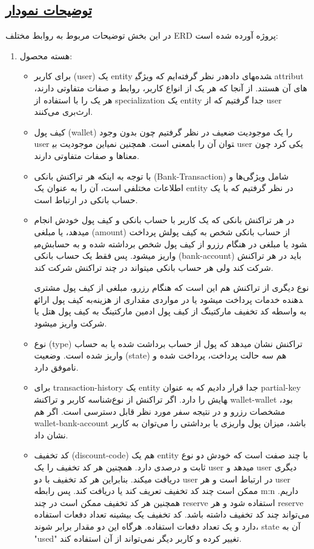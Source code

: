 \documentclass[12pt]{exam}
\begin{document}
\subsection*{\underline{توضیحات نمودار}}

در این بخش توضیحات مربوط به روابط مختلف ERD پروژه آورده شده است:

\begin{enumerate}
	\item هسته محصول:
	\begin{itemize}
		\item 
برای کاربر (user) یک entity در نظر گرفته‌ایم که ویژگی‎های داده‎شده attribut های آن هستند. از آنجا که هر یک از انواع کاربر، روابط و صفات متفاوتی دارند، هر یک را با استفاده از specialization یک entity جدا گرفتیم که از user ارث‌بری می‌کنند.
		\item 
کیف پول (wallet) را یک موجودیت ضعیف در نظر گرفتیم چون بدون وجود user این موجودیت بی‎معنی است. همچنین نمی‎توان آن را با user یکی کرد چون معناها و صفات متفاوتی دارند.
		\item 
با توجه به اینکه هر تراکنش بانکی (Bank-Transaction) شامل ویژگی‌ها و اطلاعات مختلفی است، آن را به عنوان یک entity در نظر گرفتیم که با یک حساب بانکی در ارتباط است.

		\item 
		در هر تراکنش بانکی که یک کاربر با حساب بانکی و کیف پول خودش انجام میدهد، یا مبلغی (amount) از حساب بانکی شخص به کیف پولش پرداخت می‎شود یا مبلغی در هنگام رزرو از کیف پول شخص برداشته شده و به حسابش واریز میشود.
		پس فقط یک حساب بانکی (bank-account) باید در هر تراکنش شرکت کند ولی هر حساب بانکی میتواند در چند تراکنش شرکت کند.
		
		نوع دیگری از تراکنش هم این است که هنگام رزرو، مبلغی از کیف پول مشتری به کیف پول ارائه‎دهنده خدمات پرداخت میشود یا در مواردی مقداری از هزینه به واسطه کد تخفیف مارکتینگ از کیف پول ادمین مارکتینگ به کیف پول هتل یا شرکت واریز میشود.
		\item 
		نوع (type) تراکنش نشان میدهد که پول از حساب برداشت شده یا به حساب واریز شده است. \linebreak وضعیت (state) هم سه حالت پرداخت، پرداخت شده و ناموفق دارد.
		\item 
برای transaction-history یک entity جدا قرار دادیم که به عنوان partial-key شناسه کاربر و تراکنش‎هایش را دارد. اگر تراکنش از نوع wallet-wallet بود، مشخصات رزرو و در نتیجه سفر مورد نظر قابل دسترسی است. اگر هم wallet-bank-account باشد، میزان پول واریزی یا برداشتی را می‌توان به کاربر نشان داد.
		\item 
کد تخفیف (discount-code) هم یک entity با چند صفت است که خودش دو نوع ثابت و درصدی دارد. همچنین هر کد تخفیف را یک user میدهد و user دیگری دریافت میکند. بنابراین هر کد تخفیف با دو user در ارتباط است و هر user ممکن است چند کد تخفیف تعریف کند یا دریافت کند. پس رابطه m:n داریم.
همچنین هر کد تخفیف ممکن است در چند reserve استفاده شود و هر reserve می‌تواند چند کد تخفیف داشته باشد.
کد تخفیف یک بیشینه تعداد دفعات استفاده دارد و یک تعداد دفعات استفاده. هرگاه این دو مقدار برابر شوند، state آن به "used" تغییر کرده و کاربر دیگر نمی‌تواند از آن استفاده کند.
		
	\end{itemize}
\end{enumerate}
\pagebreak
\end{document}
